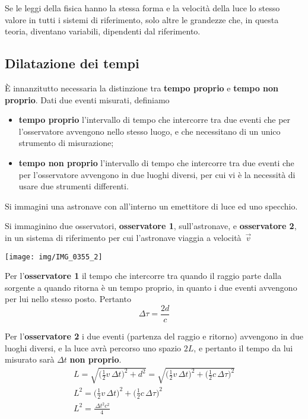 \documentclass[a4paper, oneside]{article}
\newcounter{i}%
\newcounter{n}%
\newcounter{I}%
\begin{document}
Se le leggi della fisica hanno la stessa forma e la velocità della luce lo stesso valore in tutti i sistemi di riferimento, solo altre le grandezze che, in questa teoria, diventano variabili, dipendenti dal riferimento.

\subsection{Dilatazione dei tempi}

È innanzitutto necessaria la distinzione tra \textbf{tempo proprio} e \textbf{tempo non proprio}.
Dati due eventi misurati, definiamo
\begin{itemize}
\item \textbf{tempo proprio} l'intervallo di tempo che intercorre tra due eventi che per l'osservatore avvengono nello stesso luogo, e che necessitano di un unico strumento di misurazione;
\item \textbf{tempo non proprio} l'intervallo di tempo che intercorre tra due eventi che per l'osservatore avvengono in due luoghi diversi, per cui vi è la necessità di usare due strumenti differenti.
\end{itemize}

Si immagini una astronave con all'interno un emettitore di luce ed uno specchio.

Si immaginino due osservatori, \textbf{osservatore 1}, sull'astronave, e \textbf{osservatore 2}, in un sistema di riferimento per cui l'astronave viaggia a velocità~$\vec{v}$

\begin{center}
\texttt{[image: img/IMG\_0355\_2]}
\end{center}

Per l'\textbf{osservatore 1} il tempo che intercorre tra quando il raggio parte dalla sorgente a quando ritorna è un tempo proprio, in quanto i due eventi avvengono per lui nello stesso posto. Pertanto
\[\Delta\tau = \frac{2d}{c}\]

Per l'\textbf{osservatore 2} i due eventi (partenza del raggio e ritorno) avvengono in due luoghi diversi, e la luce avrà percorso uno spazio $2L$, e pertanto il tempo da lui misurato sarà $\Delta t$ \textbf{non proprio}.
\begin{multline*}
L=\sqrt{\Bigg(\frac{1}{2}v\,\Delta t\Bigg)^2+d^2}=\sqrt{\Bigg(\frac{1}{2}v\,\Delta t\Bigg)^2+\Bigg(\frac{1}{2}c\,\Delta\tau\Bigg)^2}\\
L^2=\Bigg(\frac{1}{2}v\,\Delta t\Bigg)^2+\Bigg(\frac{1}{2}c\,\Delta\tau\Bigg)^2\\
L^2=\frac{\,\Delta t^2c^2}{4}
\end{multline*}
\end{document}
